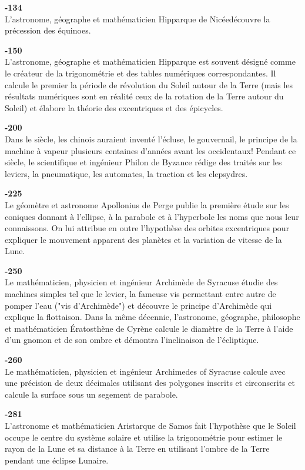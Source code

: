\textbf{-134}\\
L'astronome, géographe et mathématicien Hipparque de Nicéedécouvre la précession des équinoes.

\textbf{-150}\\
L'astronome, géographe et mathématicien Hipparque est souvent désigné comme le créateur de la trigonométrie et des tables numériques correspondantes. Il calcule le premier la période de révolution du Soleil autour de la Terre (mais les résultats numériques sont en réalité ceux de la rotation de la Terre autour du Soleil) et élabore la théorie des excentriques et des épicycles.

\textbf{-200}\\
Dans le siècle, les chinois auraient inventé l'écluse, le gouvernail, le principe de la machine à vapeur plusieurs centaines d'années avant les occidentaux! Pendant ce siècle, le scientifique et ingénieur Philon de Byzance rédige des traités sur les leviers, la pneumatique, les automates, la traction et les clepsydres.

\textbf{-225}\\
Le géomètre et astronome Apollonius de Perge publie la première étude sur les coniques donnant à l'ellipse, à la parabole et à l'hyperbole les noms que nous leur connaissons. On lui attribue en outre l'hypothèse des orbites excentriques pour expliquer le mouvement apparent des planètes et la variation de vitesse de la Lune.

\textbf{-250}\\
Le mathématicien, physicien et ingénieur Archimède de Syracuse étudie des machines simples tel que le levier, la fameuse vis permettant entre autre de pomper l'eau ("vis d'Archimède") et découvre le principe d'Archimède qui explique la flottaison. Dans la même décennie, l'astronome, géographe, philosophe et mathématicien Ératosthène de Cyrène calcule le diamètre de la Terre à l'aide d'un gnomon et de son ombre et démontra l'inclinaison de l'écliptique.

\textbf{-260}\\
Le mathématicien, physicien et ingénieur Archimedes of Syracuse calcule  avec une précision de deux décimales utilisant des polygones inscrits et circonscrits et calcule la surface sous un segement de parabole.

\textbf{-281}\\
L'astronome et mathématicien Aristarque de Samos fait l'hypothèse que le Soleil occupe le centre du système solaire et utilise la trigonométrie pour estimer le rayon de la Lune et sa distance à la Terre en utilisant l'ombre de la Terre pendant une éclipse Lunaire.

